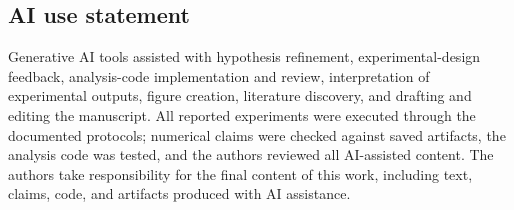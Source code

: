 \subsection*{AI use statement}
Generative AI tools assisted with hypothesis refinement, experimental-design feedback,
analysis-code implementation and review, interpretation of experimental outputs,
figure creation, literature discovery, and drafting and editing the manuscript.  All
reported experiments were executed through the documented protocols; numerical claims
were checked against saved artifacts, the analysis code was tested, and the authors
reviewed all AI-assisted content.  The authors take responsibility for the final content
of this work, including text, claims, code, and artifacts produced with AI assistance.
